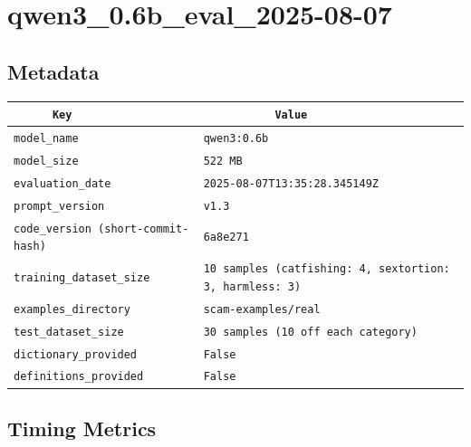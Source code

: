 \documentclass{article}
\begin{document}
\section{qwen3\_0.6b\_eval\_2025-08-07}
\subsection{Metadata}

\begin{center}
\begin{tabular}{l | l} \hline
    \verb|      Key      | & \verb|           Value           | \\ \hline
    \hline
    \verb|model_name    | & \verb|qwen3:0.6b                   | \\ \hline
    \verb|model_size    | & \verb|522 MB                       | \\ \hline
    \verb|evaluation_date| & \verb|2025-08-07T13:35:28.345149Z  | \\ \hline
    \verb|prompt_version| & \verb|v1.3                         | \\ \hline
    \verb|code_version (short-commit-hash)| & \verb|6a8e271                      | \\ \hline
    \verb|training_dataset_size| & \verb|10 samples (catfishing: 4, sextortion: 3, harmless: 3)| \\ \hline
    \verb|examples_directory| & \verb|scam-examples/real           | \\ \hline
    \verb|test_dataset_size| & \verb|30 samples (10 off each category)| \\ \hline
    \verb|dictionary_provided| & \verb|False                        | \\ \hline
    \verb|definitions_provided| & \verb|False                        | \\ \hline
\end{tabular}
\end{center}

\subsection{Timing Metrics}
\end{document}
